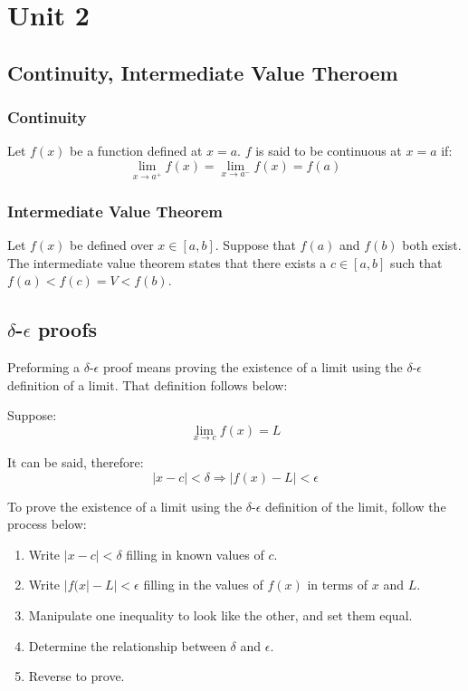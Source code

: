 \chapter{Unit 2}
\section{Continuity, Intermediate Value Theroem}
\subsection{Continuity}
Let $f(x)$ be a function defined at $x=a$. $f$ is said to be continuous at $x=a$
if:
\begin{equation}
  \lim_{x\to{a^+}} f(x) = \lim_{x\to{a^-}} f(x) = f(a)
\end{equation}

\subsection{Intermediate Value Theorem}
Let $f(x)$ be defined over $x\in[a,b]$. Suppose that $f(a)$ and $f(b)$ both
exist. The intermediate value theorem states that there exists a $c\in[a,b]$
such that $f(a)<f(c)=V<f(b)$.

\section{$\delta$-$\epsilon$ proofs}
Preforming a $\delta$-$\epsilon$ proof means proving the existence of a limit
using the $\delta$-$\epsilon$ definition of a limit. That definition follows
below:

Suppose:
$$\lim_{x\to{c}} f(x) = L$$

It can be said, therefore:
\begin{equation}
  |x-c|<\delta \Rightarrow |f(x)-L|<\epsilon
\end{equation}

To prove the existence of a limit using the $\delta$-$\epsilon$ definition of
the limit, follow the process below:
\begin{enumerate}
  \item Write $|x-c|<\delta$ filling in known values of $c$.
  \item Write $|f(x|-L|<\epsilon$ filling in the values of $f(x)$ in terms of
    $x$ and $L$.
  \item Manipulate one inequality to look like the other, and set them equal.
  \item Determine the relationship between $\delta$ and $\epsilon$.
  \item Reverse to prove.
\end{enumerate}

